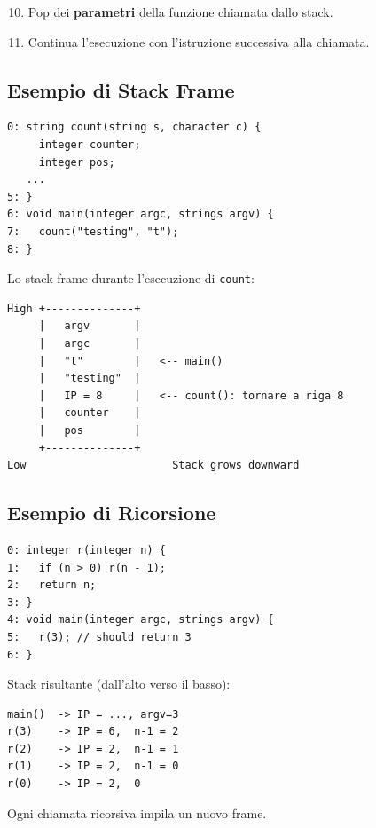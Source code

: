 \begin{enumerate}
  \setcounter{enumi}{9}
  \item Pop dei \textbf{parametri} della funzione chiamata dallo stack.
  \item Continua l'esecuzione con l'istruzione successiva alla chiamata.
\end{enumerate}

\subsection{Esempio di Stack Frame}

\begin{verbatim}
0: string count(string s, character c) {
     integer counter;
     integer pos;
   ...
5: }
6: void main(integer argc, strings argv) {
7:   count("testing", "t");
8: }
\end{verbatim}

Lo stack frame durante l'esecuzione di \texttt{count}:
\begin{verbatim}
High +--------------+
     |   argv       |
     |   argc       |
     |   "t"        |   <-- main()
     |   "testing"  |
     |   IP = 8     |   <-- count(): tornare a riga 8
     |   counter    |
     |   pos        |
     +--------------+
Low                       Stack grows downward
\end{verbatim}


\subsection{Esempio di Ricorsione}

\begin{verbatim}
0: integer r(integer n) {
1:   if (n > 0) r(n - 1);
2:   return n;
3: }
4: void main(integer argc, strings argv) {
5:   r(3); // should return 3
6: }
\end{verbatim}

Stack risultante (dall'alto verso il basso):
\begin{verbatim}
main()  -> IP = ..., argv=3
r(3)    -> IP = 6,  n-1 = 2
r(2)    -> IP = 2,  n-1 = 1
r(1)    -> IP = 2,  n-1 = 0
r(0)    -> IP = 2,  0
\end{verbatim}

Ogni chiamata ricorsiva impila un nuovo frame.

